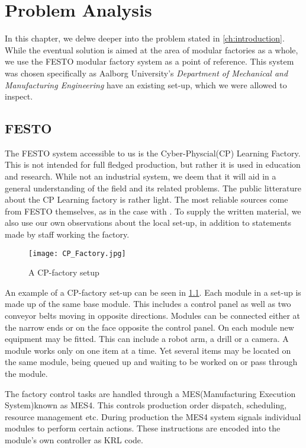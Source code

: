 \chapter{Problem Analysis}\label{ch:problemanalysis}
In this chapter, we delwe deeper into the problem stated in \cref{ch:introduction}. While the eventual solution is aimed at the area of modular factories as a whole, we use the FESTO modular factory system \cite{FESTOweb} as a point of reference. This system was chosen specifically as Aalborg University's \textit{Department of Mechanical and Manufacturing Engineering} have an existing set-up, which we were allowed to inspect. 

\section{FESTO}\label{sec:festo}
The FESTO system accessible to us is the Cyber-Physcial(CP) Learning Factory. This is not intended for full fledged production, but rather it is used in education and research. While not an industrial system, we deem that it will aid in a general understanding of the field and its related problems. The public litterature about the CP Learning factory is rather light. The most reliable sources come from FESTO themselves, as in the case with \cite{CPFactory2015}. To supply the written material, we also use our own observations about the local set-up, in addition to statements made by staff working the factory.  

\begin{figure}[h]
\centering
\texttt{[image: CP\_Factory.jpg]}
\caption{A CP-factory setup}
\label{fig:festo-example}
\end{figure}

An example of a CP-factory set-up can be seen in \cref{fig:festo-example}. Each module in a set-up is made up of the same base module. This includes a control panel as well as two conveyor belts moving in opposite directions. Modules can be connected either at the narrow ends or on the face opposite the control panel. On each module new equipment may be fitted. This can include a robot arm, a drill or a camera. A module works only on one item at a time. Yet several items may be located on the same module, being queued up and waiting to be worked on or pass through the module.

The factory control tasks are handled through a MES(Manufacturing Execution System)known as MES4. This controls production order dispatch, scheduling, resource management etc. During production the MES4 system signals individual modules to perform certain actions. These instructions are encoded into the module's own controller as KRL code.

